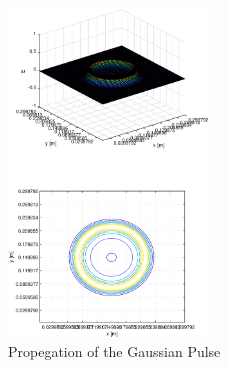 \documentclass{article}
\begin{document}
\begin{figure}
  \centering
  \includegraphics[width=200]{GaussianPropegation}
  \caption{Propegation of the Gaussian Pulse}\label{fig:GaussianPropegation}
\end{figure}
\end{document}
